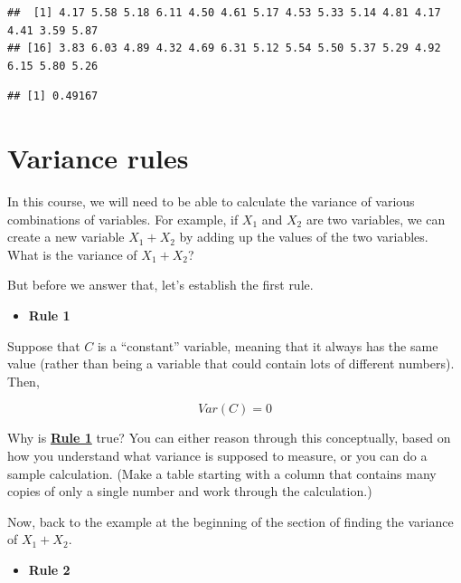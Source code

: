 \documentclass[
]{book}
\newenvironment{Shaded}{\begin{snugshade}}{\end{snugshade}}
\newcommand{\FunctionTok}[1]{\textcolor[rgb]{0.00,0.00,0.00}{#1}}
\newcommand{\NormalTok}[1]{#1}
\newcommand{\SpecialCharTok}[1]{\textcolor[rgb]{0.00,0.00,0.00}{#1}}
\providecommand{\tightlist}{%
  \setlength{\itemsep}{0pt}\setlength{\parskip}{0pt}}
\begin{document}
\begin{verbatim}
##  [1] 4.17 5.58 5.18 6.11 4.50 4.61 5.17 4.53 5.33 5.14 4.81 4.17 4.41 3.59 5.87
## [16] 3.83 6.03 4.89 4.32 4.69 6.31 5.12 5.54 5.50 5.37 5.29 4.92 6.15 5.80 5.26
\end{verbatim}

\begin{Shaded}
\end{Shaded}

\begin{verbatim}
## [1] 0.49167
\end{verbatim}

\hypertarget{variance-rules}{%
\section{Variance rules}\label{variance-rules}}

In this course, we will need to be able to calculate the variance of various combinations of variables. For example, if \(X_{1}\) and \(X_{2}\) are two variables, we can create a new variable \(X_{1} + X_{2}\) by adding up the values of the two variables. What is the variance of \(X_{1} + X_{2}\)?

But before we answer that, let's establish the first rule.

\begin{itemize}
\tightlist
\item
  \textbf{Rule 1}
\end{itemize}

Suppose that \(C\) is a ``constant'' variable, meaning that it always has the same value (rather than being a variable that could contain lots of different numbers). Then,

\[
Var\left(C\right) = 0
\]

Why is \protect\hyperlink{Rule1}{\textbf{Rule 1}} true? You can either reason through this conceptually, based on how you understand what variance is supposed to measure, or you can do a sample calculation. (Make a table starting with a column that contains many copies of only a single number and work through the calculation.)

Now, back to the example at the beginning of the section of finding the variance of \(X_{1} + X_{2}\).

\begin{itemize}
\tightlist
\item
  \textbf{Rule 2}
\end{itemize}
\end{document}
